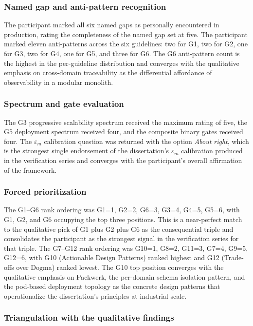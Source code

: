 \subsubsection*{Named gap and anti-pattern recognition}

The participant marked all six named gaps as personally encountered in production, rating the completeness of the named gap set at five. The participant marked eleven anti-patterns across the six guidelines: two for G1, two for G2, one for G3, two for G4, one for G5, and three for G6. The G6 anti-pattern count is the highest in the per-guideline distribution and converges with the qualitative emphasis on cross-domain traceability as the differential affordance of observability in a modular monolith.

\subsubsection*{Spectrum and gate evaluation}

The G3 progressive scalability spectrum received the maximum rating of five, the G5 deployment spectrum received four, and the composite binary gates received four. The $\varepsilon_m$ calibration question was returned with the option \emph{About right}, which is the strongest single endorsement of the dissertation's $\varepsilon_m$ calibration produced in the verification series and converges with the participant's overall affirmation of the framework.

\subsubsection*{Forced prioritization}

The G1--G6 rank ordering was G1=1, G2=2, G6=3, G3=4, G4=5, G5=6, with G1, G2, and G6 occupying the top three positions. This is a near-perfect match to the qualitative pick of G1 plus G2 plus G6 as the consequential triple and consolidates the participant as the strongest signal in the verification series for that triple. The G7--G12 rank ordering was G10=1, G8=2, G11=3, G7=4, G9=5, G12=6, with G10 (Actionable Design Patterns) ranked highest and G12 (Trade-offs over Dogma) ranked lowest. The G10 top position converges with the qualitative emphasis on Packwerk, the per-domain schema isolation pattern, and the pod-based deployment topology as the concrete design patterns that operationalize the dissertation's principles at industrial scale.

\subsubsection*{Triangulation with the qualitative findings}

